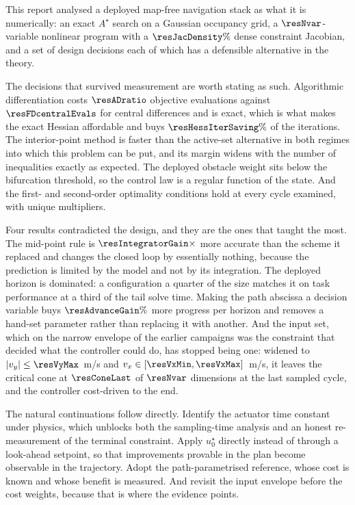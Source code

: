 \documentclass[11pt,a4paper]{article}
\newcommand{\astar}{$A^\star$}
\begin{document}
This report analysed a deployed map-free navigation stack as what it is numerically: an exact \astar{} search
on a Gaussian occupancy grid, a $\resNvar$-variable nonlinear program with a $\resJacDensity\%$ dense
constraint Jacobian, and a set of design decisions each of which has a defensible alternative in the theory.

The decisions that survived measurement are worth stating as such. Algorithmic differentiation costs
$\resADratio$ objective evaluations against $\resFDcentralEvals$ for central differences and is exact, which
is what makes the exact Hessian affordable and buys $\resHessIterSaving\%$ of the iterations. The
interior-point method is faster than the active-set alternative in both regimes into which this problem can
be put, and its margin widens with the number of inequalities exactly as expected. The deployed obstacle
weight sits below the bifurcation threshold, so the control law is a regular function of the state. And the
first- and second-order optimality conditions hold at every cycle examined, with unique multipliers.

Four results contradicted the design, and they are the ones that taught the most. The mid-point rule is
$\resIntegratorGain\times$ more accurate than the scheme it replaced and changes the closed loop by
essentially nothing, because the prediction is limited by the model and not by its integration. The deployed
horizon is dominated: a configuration a quarter of the size matches it on task performance at a third of the
tail solve time. Making the path abscissa a decision variable buys $\resAdvanceGain\%$ more progress per
horizon and removes a hand-set parameter rather than replacing it with another. And the input set, which on
the narrow envelope of the earlier campaigns was the constraint that decided what the controller could do,
has stopped being one: widened to $|v_y|\le\resVyMax$~m/s and $v_x\in[\resVxMin,\resVxMax]$~m/s, it leaves
the critical cone at $\resConeLast$ of $\resNvar$ dimensions at the last sampled cycle, and the controller
cost-driven to the end.

The natural continuations follow directly. Identify the actuator time constant under physics, which unblocks
both the sampling-time analysis and an honest re-measurement of the terminal constraint. Apply $u^\star_0$
directly instead of through a look-ahead setpoint, so that improvements provable in the plan become
observable in the trajectory. Adopt the path-parametrised reference, whose cost is known and whose benefit is
measured. And revisit the input envelope before the cost weights, because that is where the evidence points.
\end{document}

